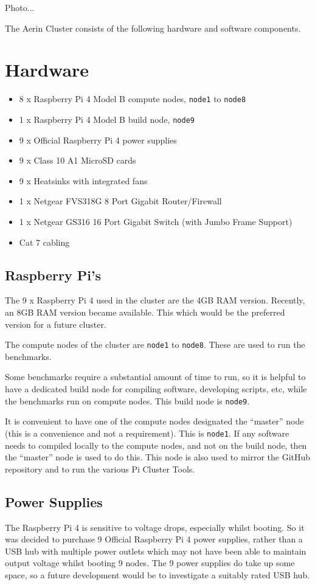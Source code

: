 \documentclass{report}
\begin{document}
Photo...

The Aerin Cluster consists of the following hardware and software components.
%
%
\section{Hardware}

\begin{itemize}
  \item 8 x Raspberry Pi 4 Model B compute nodes, \verb|node1| to \verb|node8|
  \item 1 x Raspberry Pi 4 Model B build node, \verb|node9|
  \item 9 x Official Raspberry Pi 4 power supplies
  \item 9 x Class 10 A1 MicroSD cards
  \item 9 x Heatsinks with integrated fans
  \item 1 x Netgear FVS318G 8 Port Gigabit Router/Firewall
  \item 1 x Netgear GS316 16 Port Gigabit Switch (with Jumbo Frame Support)
  \item Cat 7 cabling
\end{itemize}


%
%
\subsection{Raspberry Pi's}
The 9 x Raspberry Pi 4 used in the cluster are the 4GB RAM version. Recently, an 8GB RAM version became available. This which would be the preferred version for a future cluster.

The compute nodes of the cluster are \verb|node1| to \verb|node8|. These are used to run the benchmarks.  

Some benchmarks require a substantial amount of time to run, so it is helpful to have a dedicated build node for compiling software, developing scripts, etc, while the benchmarks run on compute nodes. This build node is \verb|node9|.

It is convenient to have one of the compute nodes designated the ``master'' node (this is a convenience and not a requirement). This is \verb|node1|. If any software needs to compiled locally to the compute nodes, and not on the build node, then the ``master'' node is used to do this. This node is also used to mirror the GitHub repository and to run the various Pi Cluster Tools. 


%
%
\subsection{Power Supplies}
The Raspberry Pi 4 is sensitive to voltage drops, especially whilst booting. So it was decided to purchase 9 Official Raspberry Pi 4 power supplies, rather than a USB hub with multiple power outlets which may not have been able to maintain output voltage whilst booting 9 nodes. The 9 power supplies do take up some space, so a future development would be to investigate a suitably rated USB hub.
\end{document}
